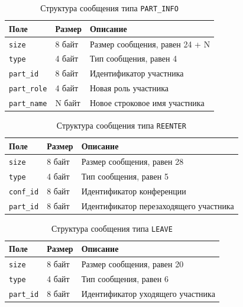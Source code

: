 \begin{table}[H]
  \centering
  \caption{Структура сообщения типа \texttt{PART\_INFO}}
  \label{tbl:msg:part-info}
  \begin{tabular}{|l|l|l|}
    \hline
    \textbf{Поле} & \textbf{Размер} & \textbf{Описание} \\ \hline
    \texttt{size} & 8 байт & Размер сообщения, равен 24 + N \\ \hline
    \texttt{type} & 4 байт & Тип сообщения, равен 4 \\ \hline
    \texttt{part\_id} & 8 байт & Идентификатор участника \\ \hline
    \texttt{part\_role} & 4 байт & Новая роль участника \\ \hline
    \texttt{part\_name} & N байт & Новое строковое имя участника \\ \hline
  \end{tabular}
\end{table}

\begin{table}[H]
  \centering
  \caption{Структура сообщения типа \texttt{REENTER}}
  \label{tbl:msg:reenter}
  \begin{tabular}{|l|l|l|}
    \hline
    \textbf{Поле} & \textbf{Размер} & \textbf{Описание} \\ \hline
    \texttt{size} & 8 байт & Размер сообщения, равен 28 \\ \hline
    \texttt{type} & 4 байт & Тип сообщения, равен 5 \\ \hline
    \texttt{conf\_id} & 8 байт & Идентификатор конференции \\ \hline
    \texttt{part\_id} & 8 байт & Идентификатор перезаходящего участника \\ \hline
  \end{tabular}
\end{table}

\begin{table}[H]
  \centering
  \caption{Структура сообщения типа \texttt{LEAVE}}
  \label{tbl:msg:leave}
  \begin{tabular}{|l|l|l|}
    \hline
    \textbf{Поле} & \textbf{Размер} & \textbf{Описание} \\ \hline
    \texttt{size} & 8 байт & Размер сообщения, равен 20 \\ \hline
    \texttt{type} & 4 байт & Тип сообщения, равен 6 \\ \hline
    \texttt{part\_id} & 8 байт & Идентификатор уходящего участника \\ \hline
  \end{tabular}
\end{table}

